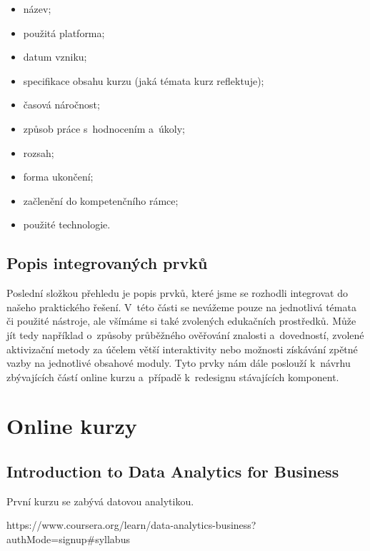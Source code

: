 \begin{itemize}
\tightlist
\item
  název;
\item
  použitá platforma;
\item
  datum vzniku;
\item
  specifikace obsahu kurzu (jaká témata kurz reflektuje);
\item
  časová náročnost;
\item
  způsob práce s~hodnocením a~úkoly;
\item
  rozsah;
\item
  forma ukončení;
\item
  začlenění do kompetenčního rámce;
\item
  použité technologie.
\end{itemize}

\hypertarget{popis-integrovanuxfdch-prvkux16f}{%
\subsection{Popis integrovaných prvků}\label{popis-integrovanuxfdch-prvkux16f}}

Poslední složkou přehledu je popis prvků, které jsme se rozhodli integrovat do našeho praktického řešení. V~této části se nevážeme pouze na jednotlivá témata či použité nástroje, ale všímáme si také zvolených edukačních prostředků. Může jít tedy například o~způsoby průběžného ověřování znalosti a~dovedností, zvolené aktivizační metody za účelem větší interaktivity nebo možnosti získávání zpětné vazby na jednotlivé obsahové moduly. Tyto prvky nám dále poslouží k~návrhu zbývajících částí online kurzu a~případě k~redesignu stávajících komponent.

\hypertarget{online-kurzy}{%
\section{Online kurzy}\label{online-kurzy}}

\hypertarget{introduction-to-data-analytics-for-business}{%
\subsection{Introduction to Data Analytics for Business}\label{introduction-to-data-analytics-for-business}}

První kurzu se zabývá datovou analytikou.~\parencite{course1}

https://www.coursera.org/learn/data-analytics-business?authMode=signup\#syllabus


